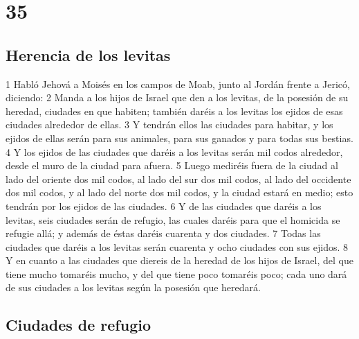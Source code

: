 \chapter{35}

\section*{Herencia de los levitas}


1 Habló Jehová a Moisés en los campos de Moab, junto al Jordán frente a Jericó, diciendo:
2 Manda a los hijos de Israel que den a los levitas, de la posesión de su heredad, ciudades en que habiten; también daréis a los levitas los ejidos de esas ciudades alrededor de ellas.
3 Y tendrán ellos las ciudades para habitar, y los ejidos de ellas serán para sus animales, para sus ganados y para todas sus bestias.
4 Y los ejidos de las ciudades que daréis a los levitas serán mil codos   alrededor, desde el muro de la ciudad para afuera.
5 Luego mediréis fuera de la ciudad al lado del oriente dos mil codos, al lado del sur dos mil codos, al lado del occidente dos mil codos, y al lado del norte dos mil codos, y la ciudad estará en medio; esto tendrán por los ejidos de las ciudades.
6 Y de las ciudades que daréis a los levitas, seis ciudades serán de refugio, las cuales daréis para que el homicida se refugie allá; y además de éstas daréis cuarenta y dos ciudades.
7 Todas las ciudades que daréis a los levitas serán cuarenta y ocho ciudades con sus ejidos.
8 Y en cuanto a las ciudades que diereis de la heredad de los hijos de Israel, del que tiene mucho tomaréis mucho, y del que tiene poco tomaréis poco; cada uno dará de sus ciudades a los levitas según la posesión que heredará.
\section*{Ciudades de refugio }

